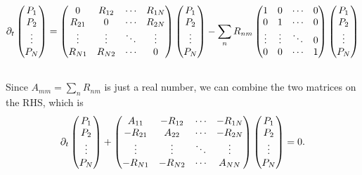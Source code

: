\documentclass[letterpaper,10pt,english]{sphinxmanual}
\begin{document}
\begin{gather}
\begin{split}\partial_t \begin{pmatrix} P_1 \\ P_2 \\ \vdots \\ P_N \end{pmatrix} = \begin{pmatrix} 0  & R_{12} & \cdots & R_{1N} \\ R_{21}  & 0 & \cdots & R_{2N} \\ \vdots & \vdots & \ddots & \vdots \\ R_{N1} & R_{N2} & \cdots & 0   \end{pmatrix} \begin{pmatrix} P_1 \\ P_2 \\ \vdots \\ P_N \end{pmatrix}   - \sum_{n}R_{nm} \begin{pmatrix}  1 & 0 & \cdots & 0 \\  0 & 1 & \cdots & 0 \\ \vdots & \vdots & \ddots &  0  \\ 0 & 0 & \cdots & 1  \end{pmatrix}  \begin{pmatrix} P_1 \\ P_2 \\ \vdots \\ P_N \end{pmatrix}\end{split}\notag\\\begin{split}\end{split}\notag
\end{gather}
Since $A_{mm} = \sum_n R_{nm}$ is just a real number, we can combine the two matrices on the RHS, which is
\begin{gather}
\begin{split}\partial_t \begin{pmatrix} P_1 \\ P_2 \\ \vdots \\ P_N \end{pmatrix} + \begin{pmatrix} A_{11}  & -R_{12} & \cdots & -R_{1N} \\ -R_{21}  & A_{22} & \cdots & -R_{2N} \\ \vdots & \vdots & \ddots & \vdots \\ -R_{N1} & -R_{N2} & \cdots & A_{NN}   \end{pmatrix} \begin{pmatrix} P_1 \\ P_2 \\ \vdots \\ P_N \end{pmatrix} = 0  .\end{split}\notag\\\begin{split}\end{split}\notag
\end{gather}
\end{document}
